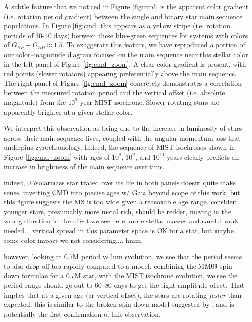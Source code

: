 \documentclass[preprint2]{aastex62}
\begin{document}
A subtle feature that we noticed in Figure \ref{fig:cmd} is the apparent color gradient (i.e. rotation period gradient) between the single and binary star main sequence populations. In Figure \ref{fig:cmd} this appears as a yellow stripe (i.e. rotation periods of 30-40 days) between these blue-green sequences for systems with colors of $G_{BP} - G_{RP} \approx 1.5$. To exaggerate this feature, we have reproduced a portion of our color--magnitude diagram focused on the main sequence near this stellar color in the left panel of Figure \ref{fig:cmd_zoom}. A clear color gradient is present, with red points (slower rotators) appearing preferentially above the main sequence.
The right panel of Figure \ref{fig:cmd_zoom} concretely demonstrates a correlation between the measured rotation period and the vertical offset (i.e. absolute magnitude) from the $10^9$ year MIST isochrone. Slower rotating stars are apparently brighter at a given stellar color.

We interpret this observation as being due to the increase in luminosity of stars across their main sequence lives, coupled with the angular momentum loss that underpins gyrochronology. Indeed, the sequence of MIST isochrones shown in Figure \ref{fig:cmd_zoom} with ages of $10^8$, $10^9$, and $10^10$ years clearly predicts an increase in brightness of the main sequence over time. 

indeed, 0.7solarmass star traced over its life in both panels doesnt quite make sense. 
inverting CMD into precise ages w/ Gaia beyond scope of this work, but this figure suggests the MS is too wide given a reasonable age range. consider: younger stars, presumably more metal rich, should be redder, moving in the wrong direction to the affect we see here. more stellar masses and careful work needed... vertical spread in this parameter space is OK for a star, but maybe some color impact we not considering.... hmm.

however, looking at 0.7M period vs lum evolution, we see that the period seems to also drop off too rapidly compared to a model. combining the MM09 spin-down formulae for a 0.7M star, with the MIST isochrone evolution, we see  the period range should go out to 60--80 days to get the right amplitude offset. That implies that at a given age (or vertical offset), the stars are rotating {\it faster} than expected. this is similar to the broken spin-down model suggested by \citep{van-saders2016}, and is potentially the first confirmation of this observation.
\end{document}
